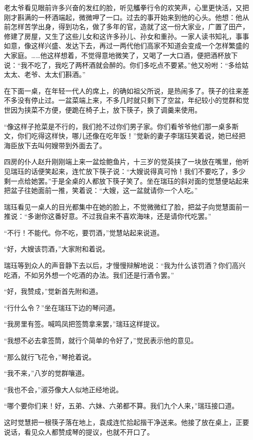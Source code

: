 \par 老太爷看见眼前许多兴奋的发红的脸，听见觿拳行令的欢笑声，心里更快活，又把刚才斟满的一杯酒端起，微微呷了一口。过去的事开始来到他的心头。他想：他从前怎样苦学出身，得到功名，做了多年的官，造就了这一份大家业，广置了田产，修建了房屋，又生了这些儿女和这许多孙儿、孙女和重孙。一家人读书知礼，事事如意，像这样兴盛、发达下去，再过一两代他们高家不知道会变成一个怎样繁盛的大家庭。……他这样想着，不觉得意地微笑了，又喝了一大口酒，便把酒杯放下说：“我不吃了，我吃了两杯酒就会醉的。你们多吃点不要紧。”他又吩咐：“多给姑太太、老爷、太太们斟酒。”
\par 在下面一桌，在年轻一代人的席上，的确如祖父所说，是热闹多了。筷子的往来差不多没有停止过。一盆菜端上来，不多几时就只剩下了空盆，年纪较小的觉群和觉世因为挟菜不方便，便跪在椅子上，放下筷子，换了调羹来使用。
\par “像这样子抢菜是不行的，我们抢不过你们男子家。你们看爷爷他们那一桌多斯文，你们吃得这样快，哪儿还像在吃年饭！”觉新的妻子李瑞珏笑着说，她已经把海臣放下去叫何嫂带到外面去了。
\par 四房的仆人赵升刚刚端上来一盆烩鲍鱼片，十三岁的觉英挟了一块放在嘴里，他听见瑞珏的话便笑起来，连忙放下筷子说：“大嫂说得真可怜！我们不要吃了，多少剩一点给她罢。”于是全桌的人都放下筷子笑了。坐在瑞珏的斜对面的觉慧便站起来把盆子往她面前一推，笑着说：“大嫂，这一盆就请你一个人吃。”
\par 瑞珏看见一桌人的目光都集中在她的脸上，不觉微微红了脸，把盆子向觉慧面前一推说：“多谢你这番好意。不过我自来不喜欢海味，还是请你代吃罢。”
\par “不行！不能代。你不吃，要罚酒，”觉慧站起来说道。
\par “好，大嫂该罚酒，”大家附和着说。
\par 瑞珏等到众人的声音静下去以后，才慢慢辩解地说：“我为什么该罚酒？你们高兴吃酒，不如另外想一个吃酒的办法。我们还是行酒令罢。”
\par “好，我赞成，”觉新首先附和道。
\par “行什么令？”坐在瑞珏下边的琴问道。
\par “我房里有签。喊鸣凤把签筒拿来罢，”瑞珏这样提议。
\par “我想不必去拿签筒，就行个简单的令好了，”觉民表示他的意见。
\par “那么就行飞花令，”琴抢着说。
\par “我不来，”八岁的觉群嚷道。
\par “我也不会，”淑芬像大人似地正经地说。
\par “哪个要你们来！好，五弟、六妹、六弟都不算。我们九个人来，”瑞珏接口道。
\par 这时觉慧把一根筷子落在地上，袁成连忙拾起揩干净送来。他接了放在桌上，正要说话，看见众人都赞成琴的提议，也就不开口了。
